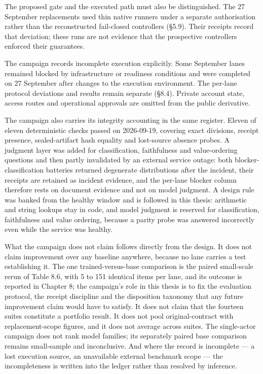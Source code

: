 \documentclass[12pt,a4paper]{report}
\begin{document}
The proposed gate and the executed path must also be distinguished. The
27 September replacements used thin native runners under a separate
authorisation rather than the reconstructed fail-closed controllers
(§5.9). Their receipts record that deviation; these runs are not
evidence that the prospective controllers enforced their guarantees.

The campaign records incomplete execution explicitly. Some September
lanes remained blocked by infrastructure or readiness conditions and
were completed on 27 September after changes to the execution
environment. The per-lane protocol deviations and results remain
separate (§8.4). Private account state, access routes and operational
approvals are omitted from the public derivative.

The campaign also carries its integrity accounting in the same register.
Eleven of eleven deterministic checks passed on 2026-09-19, covering
exact divisions, receipt presence, sealed-artifact hash equality and
lost-source absence probes. A judgment layer was added for
classification, faithfulness and value-ordering questions and then
partly invalidated by an external service outage: both
blocker-classification batteries returned degenerate distributions after
the incident, their receipts are retained as incident evidence, and the
per-lane blocker column therefore rests on document evidence and not on
model judgment. A design rule was banked from the healthy window and is
followed in this thesis: arithmetic and string lookups stay in code, and
model judgment is reserved for classification, faithfulness and value
ordering, because a parity probe was answered incorrectly even while the
service was healthy.

What the campaign does not claim follows directly from the design. It
does not claim improvement over any baseline anywhere, because no lane
carries a test establishing it. The one trained-versus-base comparison
is the paired small-scale rerun of Table 8.6, with 5 to 151 identical
items per lane, and its outcome is reported in Chapter 8; the campaign's
role in this thesis is to fix the evaluation protocol, the receipt
discipline and the disposition taxonomy that any future improvement
claim would have to satisfy. It does not claim that the fourteen suites
constitute a portfolio result. It does not pool original-contract with
replacement-scope figures, and it does not average across suites. The
single-actor campaign does not rank model families; its separately
paired base comparison remains small-sample and inconclusive. And where
the record is incomplete --- a lost execution source, an unavailable
external benchmark scope --- the incompleteness is written into the
ledger rather than resolved by inference.
\end{document}

